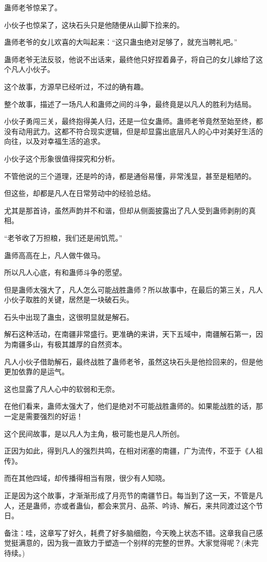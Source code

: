 \begin{this_body}
蛊师老爷惊呆了。

小伙子也惊呆了，这块石头只是他随便从山脚下捡来的。

蛊师老爷的女儿欢喜的大叫起来：“这只蛊虫绝对足够了，就充当聘礼吧。”

蛊师老爷无法反驳，他说不出话来，最终他只好捏着鼻子，将自己的女儿嫁给了这个凡人小伙子。

这个故事，方源早已经听过，不过的确有趣。

整个故事，描述了一场凡人和蛊师之间的斗争，最终竟是以凡人的胜利为结局。

小伙子勇闯三关，最终抱得美人归，还是一位女蛊师。蛊师老爷竟然至始至终，都没有动用武力。这都不符合现实逻辑，但是却显露出底层凡人的心中对美好生活的向往，以及对幸福生活的追求。

小伙子这个形象很值得探究和分析。

不管他说的三个道理，还是吟的诗，都是通俗易懂，非常浅显，甚至是粗陋的。

但这些，却都是凡人在日常劳动中的经验总结。

尤其是那首诗，虽然声韵并不和谐，但却从侧面披露出了凡人受到蛊师剥削的真相。

“老爷收了万担粮，我们还是闹饥荒。”

蛊师高高在上，凡人做牛做马。

所以凡人心底，有和蛊师斗争的愿望。

但是蛊师太强大了，凡人怎么可能战胜蛊师？所以故事中，在最后的第三关，凡人小伙子取胜的关键，居然是一块破石头。

石头中出现了蛊虫，这很明显就是解石。

解石这种活动，在南疆非常盛行。更准确的来讲，天下五域中，南疆解石第一，因为南疆多山，有极其雄厚的自然资本。

凡人小伙子借助解石，最终战胜了蛊师老爷，虽然这块石头是他捡回来的，但是他更加依靠的是运气。

这也显露了凡人心中的软弱和无奈。

在他们看来，蛊师太强大了，他们是绝对不可能战胜蛊师的。如果能战胜的话，那一定是需要强烈的好运！

这个民间故事，是以凡人为主角，极可能也是凡人所创。

正因为如此，得到凡人的强烈共鸣，在相对闭塞的南疆，广为流传，不亚于《人祖传》。

而在其他四域，却传播得相当有限，很少有人知晓。

正是因为这个故事，才渐渐形成了月亮节的南疆节日。每当到了这一天，不管是凡人，还是蛊师，亦或者蛊仙，都会来赏月、品茶、吟诗、解石，来共同渡过这个节日。

备注：哇，这章写了好久，耗费了好多脑细胞，今天晚上状态不错。这章我自己感觉挺满意的，因为我一直致力于塑造一个别样的完整的世界。大家觉得呢？(未完待续。)

\end{this_body}

